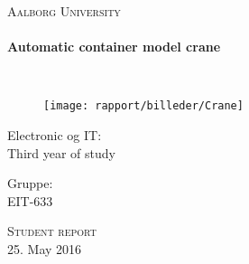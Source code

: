 %

\thispagestyle{empty}

\begin{center}

\vspace*{\fill}

\textsc{\LARGE Aalborg University}\\[1.0cm]

\HRule \\[0.4cm]
{ \HUGE \bfseries  Automatic container model crane \\[0.5cm] }

\HRule \\[1.5cm]%

\begin{figure}[H]
\centering
\texttt{[image: rapport/billeder/Crane]}
\end{figure}

\begin{minipage}{0.4\textwidth}
\begin{flushleft} \large
Electronic og IT:\\
Third year of study
\end{flushleft}
\end{minipage}
\begin{minipage}{0.4\textwidth}
\begin{flushright} \large
Gruppe: \\
EIT-633
\end{flushright}
\end{minipage}

\vspace*{\fill}

\textsc{\Large Student report}\\[1.0cm]

{\large 25. May 2016}

\end{center}